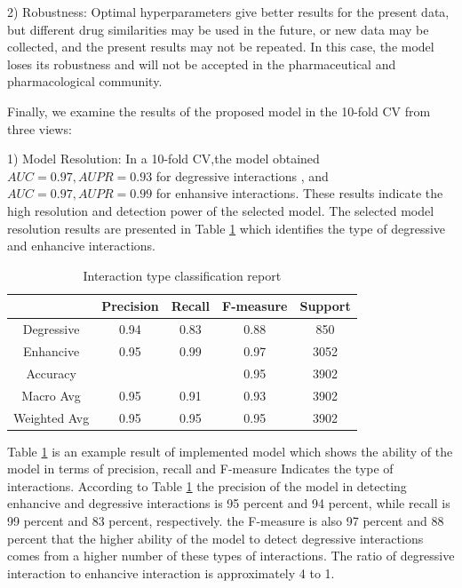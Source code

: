 \documentclass{bmcart}
\begin{document}
2) Robustness: Optimal hyperparameters give better results for the present data, but different drug similarities may be used in the future, or new data may be collected, and the present results may not be repeated. In this case, the model loses its robustness and will not be accepted in the pharmaceutical and pharmacological community.

Finally, we examine the results of the proposed model in the 10-fold CV from three views:

1) Model Resolution: In a 10-fold CV,the model obtained $AUC=0.97 , AUPR=0.93$ for degressive interactions , and $AUC=0.97,AUPR=0.99 $ for enhansive interactions. These results indicate the high resolution and detection power of the selected model. The selected model resolution results are presented in Table \ref{classificatonReport} which identifies the type of degressive and enhancive interactions.

\begin{table}[h!]
	\centering
	\begin{tabular}{|c|c|c|c|c|}
		\hline
		& Precision & Recall & F-measure & Support \\
		\hline
		Degressive & 0.94 & 0.83 & 0.88 & 850 \\
		\hline
		Enhancive & 0.95 & 0.99 & 0.97 & 3052 \\
		\hline
		Accuracy &  & & 0.95 &3902\\
		\hline
		Macro Avg & 0.95 & 0.91 & 0.93 & 3902\\
		\hline
		Weighted Avg & 0.95 & 0.95 &0.95 & 3902\\
		\hline
	\end{tabular}
	\newline
	\caption{Interaction type classification report}
	\label{classificatonReport}
\end{table}

Table \ref{classificatonReport} is an example result of implemented model which shows the ability of the model in terms of precision, recall and F-measure Indicates the type of interactions. According to Table \ref{classificatonReport} the precision of the model in detecting enhancive and degressive interactions is 95 percent and 94 percent, while recall is 99 percent and 83 percent, respectively. the F-measure is also 97  percent and 88 percent that the higher ability of the model to detect degressive interactions comes from a higher number of these types of interactions. The ratio of degressive interaction to enhancive interaction is approximately 4 to 1.
\end{document}
